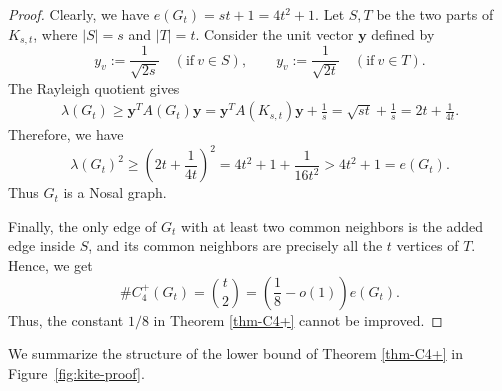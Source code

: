 \documentclass[10pt,a4paper]{amsart}
\renewcommand{\ge}{\geqslant}
\begin{document}
\begin{proof}
Clearly, we have 
$      e(G_t)=st+1=4t^2+1.$ 
Let \(S,T\) be the two parts of \(K_{s,t}\), where \(|S|=s\) and \(|T|=t\).
Consider the unit vector \( \bm{y}\) defined by
\[
        y_v:=\frac{1}{\sqrt{2s}}\quad(\text{if}~v\in S),
        \qquad
        y_v:=\frac{1}{\sqrt{2t}}\quad(\text{if}~v\in T).
\]
The Rayleigh quotient gives
\[
\begin{aligned}
        \lambda(G_t)
        \ge
        \bm{y}^T A(G_t)\bm{y}                               =
        \bm{y}^T A(K_{s,t}) \bm{y}+\frac1s                   =
        \sqrt{st}+\frac1s
        =
        2t+\frac{1}{4t}.
\end{aligned}
\]
Therefore, we have 
\[
        \lambda(G_t)^2
        \ge
        \left(2t+\frac{1}{4t}\right)^2
        =
        4t^2+1+\frac{1}{16t^2}
        >
        4t^2+1
        =
        e(G_t).
\]
Thus \(G_t\) is a Nosal graph.

Finally, the only edge of \(G_t\) with at least two common neighbors is the
added edge inside \(S\), and its common neighbors are precisely all the \(t\)
vertices of \(T\).  Hence, we get 
\[
        \texttt{\#}{C_4^+}(G_t)
        =
        {t\choose2}
        =
        \left(\frac18 - o(1)\right)e(G_t).
\]
Thus, the constant \(1/8\) in Theorem \ref{thm-C4+} cannot be improved. 
\end{proof}

 
We summarize the structure of the lower bound of Theorem \ref{thm-C4+}  in Figure~\ref{fig:kite-proof}.
\end{document}
